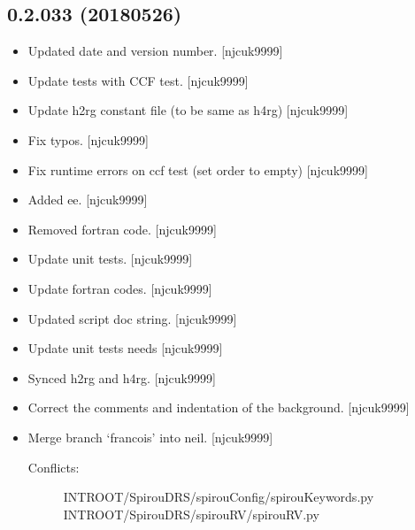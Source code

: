 \documentclass[a4paper,10pt,english]{report}
\begin{document}
\subsection{0.2.033 (2018\sphinxhyphen{}05\sphinxhyphen{}26)}
\label{\detokenize{misc/changelog:id449}}\begin{itemize}
\item {} 
Updated date and version number. {[}njcuk9999{]}

\item {} 
Update tests with CCF test. {[}njcuk9999{]}

\item {} 
Update h2rg constant file (to be same as h4rg) {[}njcuk9999{]}

\item {} 
Fix typos. {[}njcuk9999{]}

\item {} 
Fix runtime errors on ccf test (set order to empty) {[}njcuk9999{]}

\item {} 
Added ee. {[}njcuk9999{]}

\item {} 
Removed fortran code. {[}njcuk9999{]}

\item {} 
Update unit tests. {[}njcuk9999{]}

\item {} 
Update fortran codes. {[}njcuk9999{]}

\item {} 
Updated script doc string. {[}njcuk9999{]}

\item {} 
Update unit tests  needs  {[}njcuk9999{]}

\item {} 
Synced h2rg and h4rg. {[}njcuk9999{]}

\item {} 
Correct the comments and indentation of the background. {[}njcuk9999{]}

\item {} 
Merge branch ‘francois’ into neil. {[}njcuk9999{]}
\begin{description}
\item[{Conflicts:}] \leavevmode
INTROOT/SpirouDRS/spirouConfig/spirouKeywords.py
INTROOT/SpirouDRS/spirouRV/spirouRV.py


\end{description}
\end{itemize}
\end{document}
